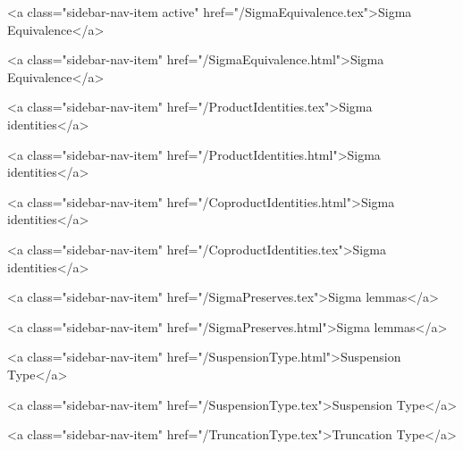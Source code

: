       
    
      
        
          <a class="sidebar-nav-item active" href="/SigmaEquivalence.tex">Sigma Equivalence</a>
        
      
    
      
        
          <a class="sidebar-nav-item" href="/SigmaEquivalence.html">Sigma Equivalence</a>
        
      
    
      
        
          <a class="sidebar-nav-item" href="/ProductIdentities.tex">Sigma identities</a>
        
      
    
      
        
          <a class="sidebar-nav-item" href="/ProductIdentities.html">Sigma identities</a>
        
      
    
      
        
          <a class="sidebar-nav-item" href="/CoproductIdentities.html">Sigma identities</a>
        
      
    
      
        
          <a class="sidebar-nav-item" href="/CoproductIdentities.tex">Sigma identities</a>
        
      
    
      
        
          <a class="sidebar-nav-item" href="/SigmaPreserves.tex">Sigma lemmas</a>
        
      
    
      
        
          <a class="sidebar-nav-item" href="/SigmaPreserves.html">Sigma lemmas</a>
        
      
    
      
        
          <a class="sidebar-nav-item" href="/SuspensionType.html">Suspension Type</a>
        
      
    
      
        
          <a class="sidebar-nav-item" href="/SuspensionType.tex">Suspension Type</a>
        
      
    
      
        
          <a class="sidebar-nav-item" href="/TruncationType.tex">Truncation Type</a>
        
